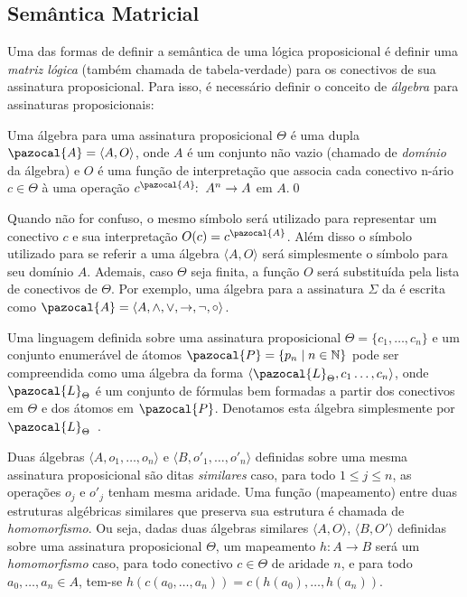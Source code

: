     \subsection{Semântica Matricial}
        Uma das formas de definir a semântica de uma lógica proposicional é definir uma \textit{matriz lógica} (também chamada de tabela-verdade) para os conectivos de sua assinatura proposicional. Para isso, é necessário definir o conceito de \textit{álgebra} para assinaturas proposicionais:

        \begin{definicao}\label{def:algebra}
            Uma álgebra para uma assinatura proposicional $\Theta$ é uma dupla $\pazocal{A} = \langle A, O \rangle$, onde $A$ é um conjunto não vazio (chamado de \textit{domínio} da álgebra) e $O$ é uma função de interpretação que associa cada conectivo n-ário $c \in \Theta$ à uma operação $c^{\pazocal{A}}\!\! : \; A^{n} \to A$ em $A$.\qed{}
        \end{definicao}

        Quando não for confuso, o mesmo símbolo será utilizado para representar um conectivo $c$ e sua interpretação $O(c) = c^{\pazocal{A}}$. Além disso o símbolo utilizado para se referir a uma álgebra $\langle A, O \rangle$ será simplesmente o símbolo para seu domínio $A$. Ademais, caso $\Theta$ seja finita, a função $O$ será substituída pela lista de conectivos de $\Theta$. Por exemplo, uma álgebra para a assinatura $\Sigma$ da \lfium{} é escrita como $\pazocal{A} = \langle A,\land, \lor, \to, \neg, \circ \rangle$.

        \begin{observacao}
            Uma linguagem definida sobre uma assinatura proposicional $\Theta = \{c_{1}, \ldots, c_{n}\}$ e um conjunto enumerável de átomos $\pazocal{P} = \{p_{n} \; | \; n \in \mathbb{N} \}$ pode ser compreendida como uma álgebra da forma $\langle \pazocal{L}_{\Theta}, c_{1}\ldots, c_{n} \rangle$, onde $\pazocal{L}_{\Theta}$ é um conjunto de fórmulas bem formadas a partir dos conectivos em $\Theta$ e dos átomos em $\pazocal{P}$. Denotamos esta álgebra simplesmente por $\pazocal{L}_{\Theta}$~\cite{Sikorski1966-SIKAOF,Wojcicki1984-WJCLOP}.
        \end{observacao}

        Duas álgebras $\langle A, o_1, \ldots, o_n \rangle$ e $\langle B, o'_1, \ldots, o'_n \rangle$ definidas sobre uma mesma assinatura proposicional são ditas \textit{similares} caso, para todo $1 \leq j \leq n$, as operações $o_j$ e $o'_j$ tenham mesma aridade. Uma função (mapeamento) entre duas estruturas algébricas similares que preserva sua estrutura é chamada de \textit{homomorfismo}. Ou seja, dadas duas álgebras similares $\langle A, O \rangle$, $\langle B, O' \rangle$ definidas sobre uma assinatura proposicional $\Theta$, um mapeamento $h : A \to B$ será um \textit{homomorfismo} caso, para todo conectivo $c \in \Theta$ de aridade $n$, e para todo $a_{0},\ldots,a_{n} \in A$, tem-se $h(c(a_{0},\ldots, a_{n})) = c(h(a_{0}),\ldots, h(a_{n}))$.

